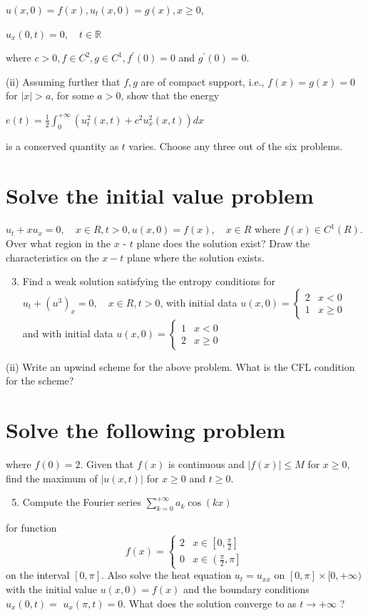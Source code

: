\documentclass[10pt]{article}
\begin{document}
$u(x, 0)=f(x), u_{t}(x, 0)=g(x), x \geq 0$,

$u_{x}(0, t)=0, \quad t \in \mathbb{R}$

where $c>0, f \in C^{2}, g \in C^{1}, f^{\prime}(0)=0$ and $g^{\prime}(0)=0$.

(ii) Assuming further that $f, g$ are of compact support, i.e., $f(x)=g(x)=0$ for $|x|>a$, for some $a>0$, show that the energy

$e(t)=\frac{1}{2} \int_{0}^{+\infty}\left(u_{t}^{2}(x, t)+c^{2} u_{x}^{2}(x, t)\right) d x$

is a conserved quantity as $t$ varies. Choose any three out of the six problems.

\section{Solve the initial value problem}
$u_{t}+x u_{x}=0, \quad x \in R, t>0, u(x, 0)=f(x), \quad x \in R$ where $f(x) \in C^{\mathrm{1}}(R)$. Over what region in the $x$ - $t$ plane does the solution exist? Draw the characteristics on the $x-t$ plane where the solution exists.

\begin{enumerate}
  \setcounter{enumi}{2}
  \item Find a weak solution satisfying the entropy conditions for $u_{t}+\left(u^{3}\right)_{x}=0, \quad x \in R, t>0$, with initial data $u(x, 0)= \begin{cases}2 & x<0 \\ 1 & x \geq 0\end{cases}$ and with initial data $u(x, 0)= \begin{cases}1 & x<0 \\ 2 & x \geq 0\end{cases}$
\end{enumerate}
(ii) Write an upwind scheme for the above problem. What is the CFL condition for the scheme?

\section{Solve the following problem}
where $f(0)=2$. Given that $f(x)$ is continuous and $|f(x)| \leq M$ for $x \geq 0$, find the maximum of $|u(x, t)|$ for $x \geq 0$ and $t \geq 0$.

\begin{enumerate}
  \setcounter{enumi}{4}
  \item Compute the Fourier series $\sum_{k=0}^{+\infty} a_{k} \cos (k x)$
\end{enumerate}
for function
$$
f(x)= \begin{cases}2 & x \in\left[0, \frac{\pi}{2}\right] \\ 0 & x \in\left(\frac{\pi}{2}, \pi\right]\end{cases}
$$
on the interval $[0, \pi]$. Also solve the heat equation $u_{t}=u_{x x}$ on $[0, \pi] \times[0,+\infty)$ with the initial value $u(x, 0)=f(x)$ and the boundary conditions $u_{x}(0, t)=$ $u_{x}(\pi, t)=0$. What does the solution converge to as $t \rightarrow+\infty$ ?
\end{document}
